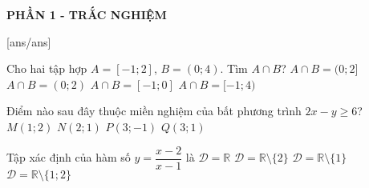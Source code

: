 

\begin{center}
	\textbf{PHẦN 1 - TRẮC NGHIỆM}
\end{center}
[ans/ans]
\begin{ex}%
 Cho hai tập hợp $A=[-1;2]$, $B=(0;4)$. Tìm $A \cap B$?
 \choice
 {\True $A \cap B = (0;2]$}
 {$A \cap B = (0;2)$}
 {$A \cap B = [-1;0]$}
 {$A \cap B = [-1;4)$}
 \loigiai{
 	Ta có $A \cap B = (0;2]$.
 }
\end{ex}

\begin{ex}%
	Điểm nào sau đây thuộc miền nghiệm của bất phương trình $2x-y \geq 6$?
	\choice
	{$M(1;2)$}
	{$N(2;1)$}
	{\True $P(3;-1)$}
	{$Q(3;1)$}
\end{ex}

\begin{ex}%
	Tập xác định của hàm số $y=\dfrac{x-2}{x-1}$ là
	\choice 
	{$\mathscr{D}= \mathbb{R}$}
	{$\mathscr{D}=\mathbb{R} \setminus \{2\}$}
	{\True $\mathscr{D}=\mathbb{R} \setminus \{1\}$}
	{$\mathscr{D}=\mathbb{R} \setminus \{1;2\}$}
\end{ex}

